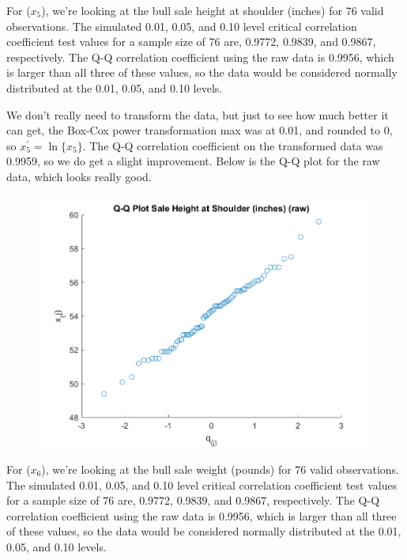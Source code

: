 For ($x_{5}$), we're looking at the bull sale height at shoulder (inches) for 76 valid observations. The simulated 0.01, 0.05, and 0.10 level critical correlation coefficient test values for a sample size of 76 are, 0.9772, 0.9839, and 0.9867, respectively. The Q-Q correlation coefficient using the raw data is 0.9956, which is larger than all three of these values, so the data would be considered normally distributed at the 0.01, 0.05, and 0.10 levels.

We don't really need to transform the data, but just to see how much better it can get, the Box-Cox power transformation max was at 0.01, and rounded to 0, so $x_{5}^{\prime} = \ln\{x_{5}\}$. The Q-Q correlation coefficient on the transformed data was 0.9959, so we do get a slight improvement. Below is the Q-Q plot for the raw data, which looks really good.

\begin{center}
    \begin{figure}[H]
        \centering
        \includegraphics[scale=0.6]{./matlab/chapter-4/sol4.38.qq.5.png}
    \end{figure}
\end{center}

For ($x_{6}$), we're looking at the bull sale weight (pounds) for 76 valid observations. The simulated 0.01, 0.05, and 0.10 level critical correlation coefficient test values for a sample size of 76 are, 0.9772, 0.9839, and 0.9867, respectively. The Q-Q correlation coefficient using the raw data is 0.9956, which is larger than all three of these values, so the data would be considered normally distributed at the 0.01, 0.05, and 0.10 levels.

